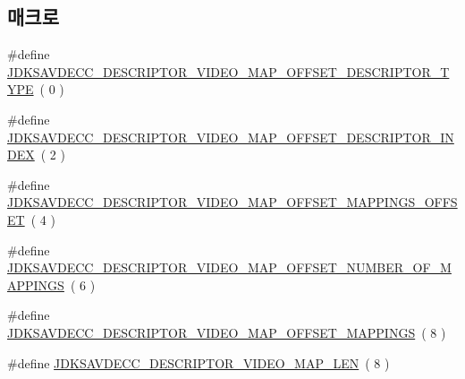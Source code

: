 \subsection*{매크로}
\begin{DoxyCompactItemize}
\item 
\#define \hyperlink{group__descriptor__video__map_ga804a73a9953b27f02d8362262fef233b}{J\+D\+K\+S\+A\+V\+D\+E\+C\+C\+\_\+\+D\+E\+S\+C\+R\+I\+P\+T\+O\+R\+\_\+\+V\+I\+D\+E\+O\+\_\+\+M\+A\+P\+\_\+\+O\+F\+F\+S\+E\+T\+\_\+\+D\+E\+S\+C\+R\+I\+P\+T\+O\+R\+\_\+\+T\+Y\+PE}~( 0 )
\item 
\#define \hyperlink{group__descriptor__video__map_ga71fcc2873352c7ac3d61d03a65606d94}{J\+D\+K\+S\+A\+V\+D\+E\+C\+C\+\_\+\+D\+E\+S\+C\+R\+I\+P\+T\+O\+R\+\_\+\+V\+I\+D\+E\+O\+\_\+\+M\+A\+P\+\_\+\+O\+F\+F\+S\+E\+T\+\_\+\+D\+E\+S\+C\+R\+I\+P\+T\+O\+R\+\_\+\+I\+N\+D\+EX}~( 2 )
\item 
\#define \hyperlink{group__descriptor__video__map_gaf37f23c6af964f2c00198a63465abd7b}{J\+D\+K\+S\+A\+V\+D\+E\+C\+C\+\_\+\+D\+E\+S\+C\+R\+I\+P\+T\+O\+R\+\_\+\+V\+I\+D\+E\+O\+\_\+\+M\+A\+P\+\_\+\+O\+F\+F\+S\+E\+T\+\_\+\+M\+A\+P\+P\+I\+N\+G\+S\+\_\+\+O\+F\+F\+S\+ET}~( 4 )
\item 
\#define \hyperlink{group__descriptor__video__map_gae192992bf08820a160728046c9cdc706}{J\+D\+K\+S\+A\+V\+D\+E\+C\+C\+\_\+\+D\+E\+S\+C\+R\+I\+P\+T\+O\+R\+\_\+\+V\+I\+D\+E\+O\+\_\+\+M\+A\+P\+\_\+\+O\+F\+F\+S\+E\+T\+\_\+\+N\+U\+M\+B\+E\+R\+\_\+\+O\+F\+\_\+\+M\+A\+P\+P\+I\+N\+GS}~( 6 )
\item 
\#define \hyperlink{group__descriptor__video__map_ga19dc7ef0ee6cc6550aeb6659d092bd47}{J\+D\+K\+S\+A\+V\+D\+E\+C\+C\+\_\+\+D\+E\+S\+C\+R\+I\+P\+T\+O\+R\+\_\+\+V\+I\+D\+E\+O\+\_\+\+M\+A\+P\+\_\+\+O\+F\+F\+S\+E\+T\+\_\+\+M\+A\+P\+P\+I\+N\+GS}~( 8 )
\item 
\#define \hyperlink{group__descriptor__video__map_gae5c0ae299ea04d5b4fea8f932bf1c268}{J\+D\+K\+S\+A\+V\+D\+E\+C\+C\+\_\+\+D\+E\+S\+C\+R\+I\+P\+T\+O\+R\+\_\+\+V\+I\+D\+E\+O\+\_\+\+M\+A\+P\+\_\+\+L\+EN}~( 8 )
\end{DoxyCompactItemize}
